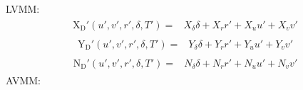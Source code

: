 \documentclass[review]{elsarticle}
\begin{document}
\sphinxAtStartPar
LVMM:
\begin{equation}\label{equation:02.01_VMMs:eqxlinear}
\begin{split}\begin{split}
\operatorname{X_{D}'}{\left(u',v',r',\delta,T' \right)} = & X_{\delta} \delta + X_{r} r' + X_{u} u' + X_{v} v' 
\end{split}\end{split}
\end{equation}\begin{equation}\label{equation:02.01_VMMs:eqylinear}
\begin{split}\begin{split}
\operatorname{Y_{D}'}{\left(u',v',r',\delta,T' \right)} = & Y_{\delta} \delta + Y_{r} r' + Y_{u} u' + Y_{v} v' 
\end{split}\end{split}
\end{equation}\begin{equation}\label{equation:02.01_VMMs:eqnlinear}
\begin{split}\begin{split}
\operatorname{N_{D}'}{\left(u',v',r',\delta,T' \right)} = & N_{\delta} \delta + N_{r} r' + N_{u} u' + N_{v} v' 
\end{split}\end{split}
\end{equation}
\sphinxAtStartPar
AVMM:
\end{document}
